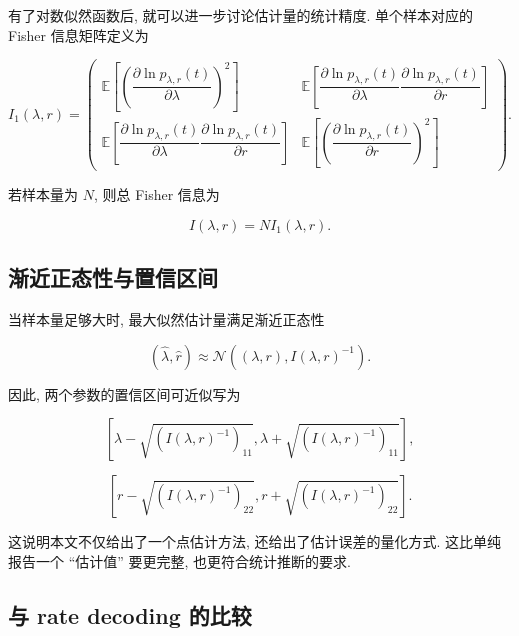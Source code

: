 \documentclass[oneside]{ctexart}
\begin{document}
有了对数似然函数后, 就可以进一步讨论估计量的统计精度. 单个样本对应的 Fisher 信息矩阵定义为

\begin{equation}
    I_1(\lambda,r)
    =
    \begin{pmatrix}
        \mathbb{E}\left[\left(\dfrac{\partial \ln p_{\lambda,r}(t)}{\partial \lambda}\right)^2\right]
         &
        \mathbb{E}\left[\dfrac{\partial \ln p_{\lambda,r}(t)}{\partial \lambda}\dfrac{\partial \ln p_{\lambda,r}(t)}{\partial r}\right]
        \\[1.2ex]
        \mathbb{E}\left[\dfrac{\partial \ln p_{\lambda,r}(t)}{\partial \lambda}\dfrac{\partial \ln p_{\lambda,r}(t)}{\partial r}\right]
         &
        \mathbb{E}\left[\left(\dfrac{\partial \ln p_{\lambda,r}(t)}{\partial r}\right)^2\right]
    \end{pmatrix}.
\end{equation}

若样本量为 $N$, 则总 Fisher 信息为

\begin{equation}
    I(\lambda,r)=NI_1(\lambda,r).
\end{equation}

\subsection{渐近正态性与置信区间}

当样本量足够大时, 最大似然估计量满足渐近正态性

\begin{equation}
    (\hat{\lambda},\hat{r})
    \approx
    \mathcal{N}\left(
    (\lambda,r),
    I(\lambda,r)^{-1}
    \right).
\end{equation}

因此, 两个参数的置信区间可近似写为

\[
    \left[
        \lambda-\sqrt{(I(\lambda,r)^{-1})_{11}},
        \lambda+\sqrt{(I(\lambda,r)^{-1})_{11}}
        \right],
\]

\[
    \left[
        r-\sqrt{(I(\lambda,r)^{-1})_{22}},
        r+\sqrt{(I(\lambda,r)^{-1})_{22}}
        \right].
\]

这说明本文不仅给出了一个点估计方法, 还给出了估计误差的量化方式. 这比单纯报告一个 ``估计值'' 要更完整, 也更符合统计推断的要求.

\subsection{与 rate decoding 的比较}
\end{document}
